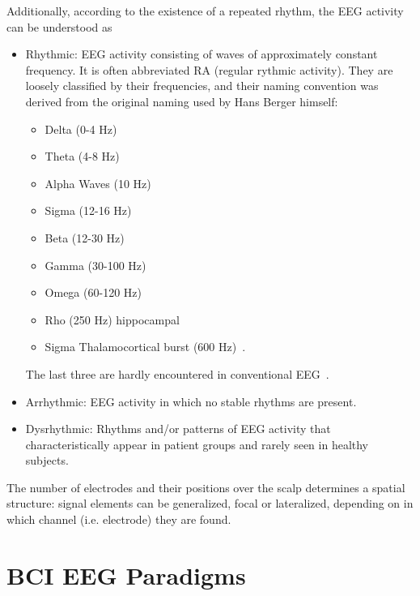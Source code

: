 \noindent Additionally, according to the existence of a repeated rhythm, the EEG activity can be understood as

\begin{itemize}
\item Rhythmic: EEG activity consisting of waves of approximately constant frequency.  It is often abbreviated RA (regular rythmic activity). They are loosely classified by their frequencies, and their naming convention was derived from the original naming used by Hans Berger himself:

\begin{itemize}
\item Delta (0-4 Hz)
\item Theta (4-8 Hz)
\item Alpha Waves (10 Hz)
\item Sigma (12-16 Hz)
\item Beta (12-30 Hz)
\item Gamma (30-100 Hz)
\item Omega (60-120 Hz)
\item Rho (250 Hz) hippocampal
\item Sigma Thalamocortical burst (600 Hz)~\cite{Fedele2012}.
\end{itemize}

The last three are hardly encountered in conventional EEG~\cite{Vanhatalo2005}. 

\item Arrhythmic: EEG activity in which no stable rhythms are present.  
\item Dysrhythmic: Rhythms and/or patterns of EEG activity that characteristically appear in patient groups and rarely seen in healthy subjects.
\end{itemize}

The number of electrodes and their positions over the scalp determines a spatial structure: signal elements can be generalized, focal or lateralized, depending on in which channel (i.e. electrode) they are found.



\section{BCI EEG Paradigms}


